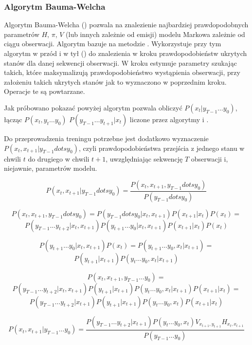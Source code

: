 \subsubsection{Algorytm Bauma-Welcha}

Algorytm Bauma-Welcha () pozwala na znalezienie najbardziej prawdopodobnych parametrów
$H$, $\pi$, $V$ (lub innych zależnie od emisji) modelu Markowa zależnie od ciągu obserwacji. Algorytm bazuje na metodzie
. Wykorzystuje przy tym algorytm w przód i w tył ()
do znalezienia w kroku  prawdopodobieństw ukrytych stanów dla danej sekwencji obserwacji.
W kroku  estymuje parametry szukając takich, które maksymalizują prawdopodobieństwo wystąpienia
obserwacji, przy założeniu takich ukrytych stanów jak to wyznaczono w poprzednim kroku. Operacje te są powtarzane.

Jak próbowano pokazać powyżej algorytm  pozwala obliczyć $P(x_t | y_{T-1} \dots y_0)$,
łącząc $P(x_t, y_t \dots y_0)$ $P(y_{T-1} \dots y_{t+1} | x_t)$ liczone przez algorytmy  i .

Do przeprowadzenia treningu  potrzebne jest dodatkowo wyznaczenie $P(x_t, x_{t+1} | y_{T-1} dots y_0)$,
czyli prawdopodobieństwa przejścia z jednego stanu w chwili $t$ do drugiego w chwili $t+1$,
uwzględniając sekwencję $T$ obserwacji i, niejawnie, parametrów modelu.

$$P(x_t, x_{t+1} | y_{T-1} dots y_0)
= \frac{P(x_t, x_{t+1}, y_{T-1} dots y_0)}{P(y_{T-1} dots y_0)}$$

$$P(x_t, x_{t+1}, y_{T-1} dots y_0) = P(y_{T-1} dots y_0 | x_t, x_{t+1}) P(x_{t+1} | x_t) P(x_t) = $$
$$P(y_{T-1} \dots y_{t+2} | x_t, x_{t+1}) P(y_{t+1} \dots y_0 | x_t, x_{t+1}) P(x_{t+1} | x_t) P(x_t)$$

$$P(y_{t+1} \dots y_0 | x_t, x_{t+1}) P(x_t) = P(y_{t+1} \dots y_0, x_t | x_{t+1}) = $$
$$P(y_{t+1} | x_{t+1}) P(y_t \dots y_0, x_t | x_{t+1})$$

$$P(x_t, x_{t+1}, y_{T-1} \dots y_0) =$$
$$P(y_{T-1} \dots y_{t+2} | x_t, x_{t+1}) P(y_{t+1} | x_{t+1}) P(y_t \dots y_0, x_t | x_{t+1}) P(x_{t+1} | x_t) =$$
$$P(y_{T-1} \dots y_{t+2} | x_{t+1}) P(y_{t+1} | x_{t+1}) P(y_t \dots y_0, x_t) P(x_{t+1} | x_t)$$

$$P(x_t, x_{t+1} | y_{T-1} \dots y_0)
= \frac{P(y_{T-1} \dots y_{t+2} | x_{t+1}) P(y_t \dots y_0, x_t) V_{x_{t+1}, y_{t+1}} H_{x_t, x_{t+1}}}{P(y_{T-1} \dots y_0)}$$

